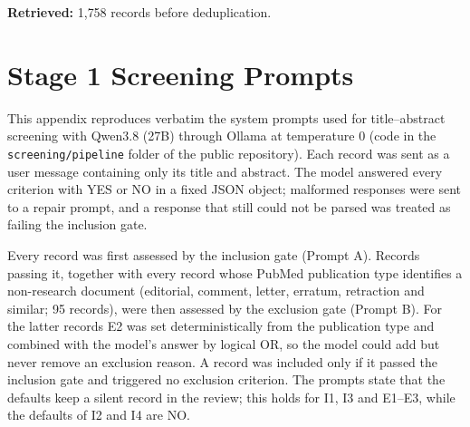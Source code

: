 \textbf{Retrieved:} 1{,}758 records before deduplication.





\section{Stage 1 Screening Prompts}
\label{appendix:screening_prompts}

This appendix reproduces verbatim the system prompts used for title--abstract screening with Qwen3.8 (27B) through Ollama at temperature 0 (code in the \texttt{screening/pipeline} folder of the public repository). Each record was sent as a user message containing only its title and abstract. The model answered every criterion with YES or NO in a fixed JSON object; malformed responses were sent to a repair prompt, and a response that still could not be parsed was treated as failing the inclusion gate.

Every record was first assessed by the inclusion gate (Prompt A). Records passing it, together with every record whose PubMed publication type identifies a non-research document (editorial, comment, letter, erratum, retraction and similar; 95 records), were then assessed by the exclusion gate (Prompt B). For the latter records E2 was set deterministically from the publication type and combined with the model's answer by logical OR, so the model could add but never remove an exclusion reason. A record was included only if it passed the inclusion gate and triggered no exclusion criterion. The prompts state that the defaults keep a silent record in the review; this holds for I1, I3 and E1--E3, while the defaults of I2 and I4 are NO.

